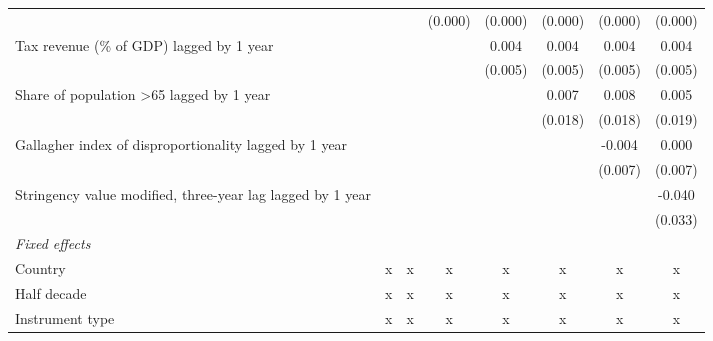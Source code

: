 \begin{tabular}{lccccccc}
                                                                                &         &               & (0.000)       & (0.000)       & (0.000)       & (0.000)       & (0.000)\\   
   Tax revenue (\% of GDP) lagged by 1 year                                     &         &               &               & 0.004         & 0.004         & 0.004         & 0.004\\   
                                                                                &         &               &               & (0.005)       & (0.005)       & (0.005)       & (0.005)\\   
   Share of population >65 lagged by 1 year                                     &         &               &               &               & 0.007         & 0.008         & 0.005\\   
                                                                                &         &               &               &               & (0.018)       & (0.018)       & (0.019)\\   
   Gallagher index of disproportionality lagged by 1 year                       &         &               &               &               &               & -0.004        & 0.000\\   
                                                                                &         &               &               &               &               & (0.007)       & (0.007)\\   
   Stringency value modified, three-year lag lagged by 1 year                   &         &               &               &               &               &               & -0.040\\   
                                                                                &         &               &               &               &               &               & (0.033)\\   
   \emph{Fixed effects}\\
   Country                                                                      & x       & x             & x             & x             & x             & x             & x\\  
   Half decade                                                                  & x       & x             & x             & x             & x             & x             & x\\  
   Instrument type                                                              & x       & x             & x             & x             & x             & x             & x\\  

\end{tabular}
